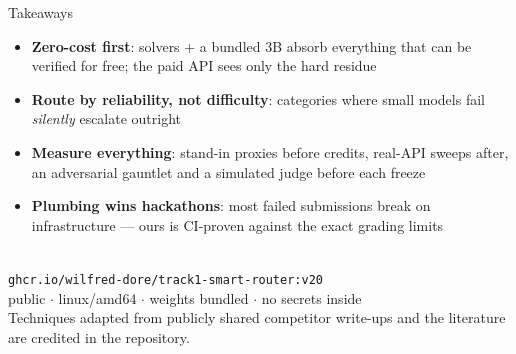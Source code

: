 \documentclass[aspectratio=169]{beamer}
\begin{document}
\begin{frame}{Takeaways}
  \begin{itemize}
    \item \textbf{Zero-cost first}: solvers + a bundled 3B absorb everything that can be verified for free; the paid API sees only the hard residue
    \item \textbf{Route by reliability, not difficulty}: categories where small models fail \emph{silently} escalate outright
    \item \textbf{Measure everything}: stand-in proxies before credits, real-API sweeps after, an adversarial gauntlet and a simulated judge before each freeze
    \item \textbf{Plumbing wins hackathons}: most failed submissions break on infrastructure --- ours is CI-proven against the exact grading limits
  \end{itemize}
  \vspace{0.5cm}
  \centering
  \\[2mm]
  \texttt{ghcr.io/wilfred-dore/track1-smart-router:v20}\\[1mm]
  \small public $\cdot$ linux/amd64 $\cdot$ weights bundled $\cdot$ no secrets inside \\[1mm]
  \scriptsize Techniques adapted from publicly shared competitor write-ups and the literature are credited in the repository.
\end{frame}
\end{document}
